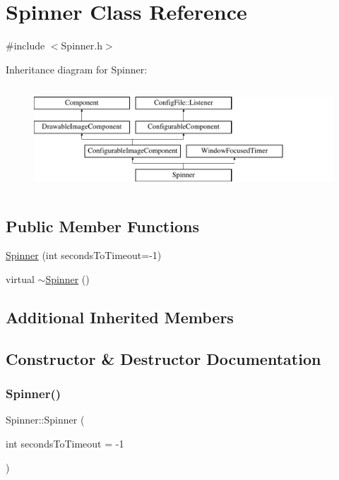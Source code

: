 \hypertarget{classSpinner}{}\section{Spinner Class Reference}
\label{classSpinner}


{\ttfamily \#include $<$Spinner.\+h$>$}

Inheritance diagram for Spinner\+:\begin{figure}[H]
\begin{center}
\leavevmode
\includegraphics[height=3.950617cm]{classSpinner}
\end{center}
\end{figure}
\subsection*{Public Member Functions}
\begin{DoxyCompactItemize}
\item 
\mbox{\hyperlink{classSpinner_a8302094b89dfe635159b223a017c5ebb}{Spinner}} (int seconds\+To\+Timeout=-\/1)
\item 
virtual \mbox{\hyperlink{classSpinner_aa5f030932425393cb35a7a69158103e9}{$\sim$\+Spinner}} ()
\end{DoxyCompactItemize}
\subsection*{Additional Inherited Members}


\subsection{Constructor \& Destructor Documentation}
\mbox{\label{classSpinner_a8302094b89dfe635159b223a017c5ebb}} 
\subsubsection{\texorpdfstring{Spinner()}{Spinner()}}
{\footnotesize\ttfamily Spinner\+::\+Spinner (\begin{DoxyParamCaption}\item[{int}]{seconds\+To\+Timeout = {\ttfamily -\/1} }\end{DoxyParamCaption})}


